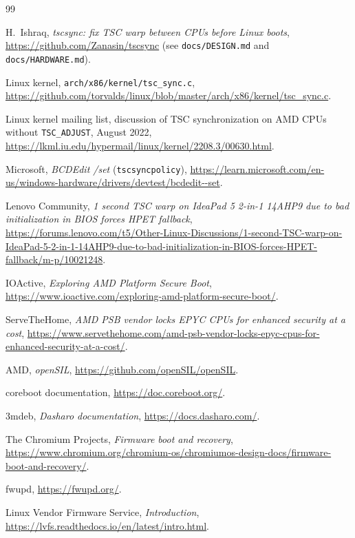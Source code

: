 \documentclass[11pt,a4paper]{article}
\newcommand{\code}[1]{\texttt{#1}}
\begin{document}
\begin{thebibliography}{99}
\small

H.~Ishraq, \emph{tscsync: fix TSC warp between CPUs before Linux boots},
\url{https://github.com/Zanasin/tscsync} (see \code{docs/DESIGN.md} and
\code{docs/HARDWARE.md}).

Linux kernel, \code{arch/x86/kernel/tsc\_sync.c},
\url{https://github.com/torvalds/linux/blob/master/arch/x86/kernel/tsc_sync.c}.

Linux kernel mailing list, discussion of TSC synchronization on AMD CPUs
without \code{TSC\_ADJUST}, August 2022,
\url{https://lkml.iu.edu/hypermail/linux/kernel/2208.3/00630.html}.

Microsoft, \emph{BCDEdit /set} (\code{tscsyncpolicy}),
\url{https://learn.microsoft.com/en-us/windows-hardware/drivers/devtest/bcdedit--set}.

Lenovo Community, \emph{1 second TSC warp on IdeaPad 5 2-in-1 14AHP9 due to
bad initialization in BIOS forces HPET fallback},
\url{https://forums.lenovo.com/t5/Other-Linux-Discussions/1-second-TSC-warp-on-IdeaPad-5-2-in-1-14AHP9-due-to-bad-initialization-in-BIOS-forces-HPET-fallback/m-p/10021248}.

IOActive, \emph{Exploring AMD Platform Secure Boot},
\url{https://www.ioactive.com/exploring-amd-platform-secure-boot/}.

ServeTheHome, \emph{AMD PSB vendor locks EPYC CPUs for enhanced security at a
cost},
\url{https://www.servethehome.com/amd-psb-vendor-locks-epyc-cpus-for-enhanced-security-at-a-cost/}.

AMD, \emph{openSIL}, \url{https://github.com/openSIL/openSIL}.

coreboot documentation, \url{https://doc.coreboot.org/}.

3mdeb, \emph{Dasharo documentation}, \url{https://docs.dasharo.com/}.

The Chromium Projects, \emph{Firmware boot and recovery},
\url{https://www.chromium.org/chromium-os/chromiumos-design-docs/firmware-boot-and-recovery/}.

fwupd, \url{https://fwupd.org/}.

Linux Vendor Firmware Service, \emph{Introduction},
\url{https://lvfs.readthedocs.io/en/latest/intro.html}.

\end{thebibliography}
\end{document}
